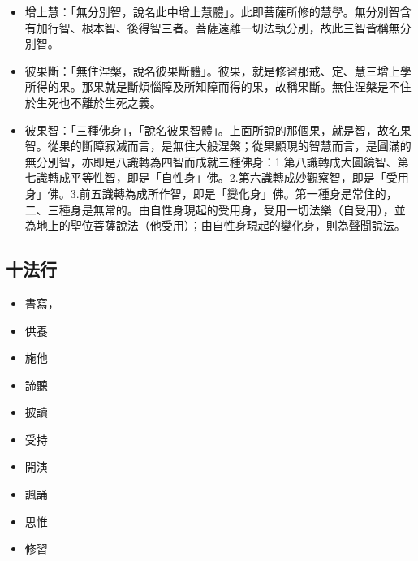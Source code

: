 \begin{itemize}
  \item 增上慧：「無分別智，說名此中增上慧體」。此即菩薩所修的慧學。無分別智含有加行智、根本智、後得智三者。菩薩遠離一切法執分別，故此三智皆稱無分別智。
  \item 彼果斷：「無住涅槃，說名彼果斷體」。彼果，就是修習那戒、定、慧三增上學所得的果。那果就是斷煩惱障及所知障而得的果，故稱果斷。無住涅槃是不住於生死也不離於生死之義。
  \item 彼果智：「三種佛身」，「說名彼果智體」。上面所說的那個果，就是智，故名果智。從果的斷障寂滅而言，是無住大般涅槃；從果顯現的智慧而言，是圓滿的無分別智，亦即是八識轉為四智而成就三種佛身：1.第八識轉成大圓鏡智、第七識轉成平等性智，即是「自性身」佛。2.第六識轉成妙觀察智，即是「受用身」佛。3.前五識轉為成所作智，即是「變化身」佛。第一種身是常住的，二、三種身是無常的。由自性身現起的受用身，受用一切法樂（自受用），並為地上的聖位菩薩說法（他受用）；由自性身現起的變化身，則為聲聞說法。
\end{itemize}

\subsection{十法行}

\begin{itemize}
  \item 書寫，
  \item 供養
  \item 施他
  \item 諦聽
  \item 披讀
  \item 受持
  \item 開演
  \item 諷誦
  \item 思惟
  \item 修習
\end{itemize}
